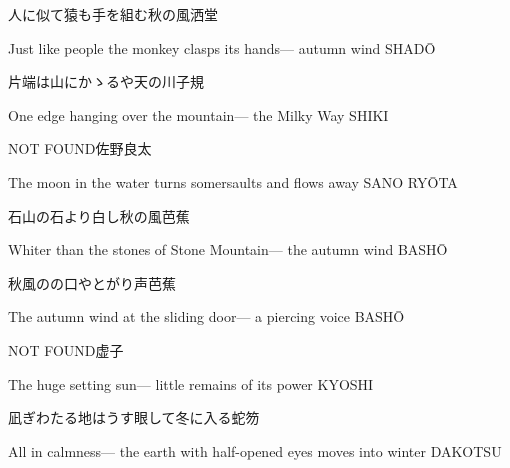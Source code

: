 \begin{haiku}
    {\FH 人に似て猿も手を組む秋の風}\hfill{\FH 洒堂}

    \vin{} Just like people
    \vin{} \vin{} the monkey clasps its hands---
    \vin{} \vin{} \vin{} autumn wind \hspace{\fill} SHAD\={O}
\end{haiku}

\begin{haiku}
    {\FH 片端は山にかゝるや天の川}\hfill{\FH 子規}

    \vin{} One edge
    \vin{} \vin{} hanging over the mountain---
    \vin{} \vin{} \vin{} the Milky Way \hspace{\fill} SHIKI
\end{haiku}

\begin{haiku}
    NOT FOUND\hfill{\FH 佐野良太}

    \vin{} The moon in the water
    \vin{} \vin{} turns somersaults
    \vin{} \vin{} \vin{} and flows away \hspace{\fill} SANO RY\={O}TA
\end{haiku}

\begin{haiku}
    {\FH 石山の石より白し秋の風}\hfill{\FH 芭蕉}

    \vin{} Whiter than
    \vin{} \vin{} the stones of Stone Mountain---
    \vin{} \vin{} \vin{} the autumn wind \hspace{\fill} BASH\={O}
\end{haiku}

\begin{haiku}
    {\FH 秋風のの口やとがり声}\hfill{\FH 芭蕉}

    \vin{} The autumn wind
    \vin{} \vin{} at the sliding door---
    \vin{} \vin{} \vin{} a piercing voice \hspace{\fill} BASH\={O}
\end{haiku}

\begin{haiku}
    NOT FOUND\hfill{\FH 虚子}

    \vin{} The huge setting sun---
    \vin{} \vin{} little remains of
    \vin{} \vin{} \vin{} its power \hspace{\fill} KYOSHI
\end{haiku}

\begin{haiku}
    {\FH 凪ぎわたる地はうす眼して冬に入る}\hfill{\FH 蛇笏}

    \vin{} All in calmness---
    \vin{} \vin{} the earth with half-opened eyes
    \vin{} \vin{} \vin{} moves into winter \hspace{\fill} DAKOTSU
\end{haiku}

